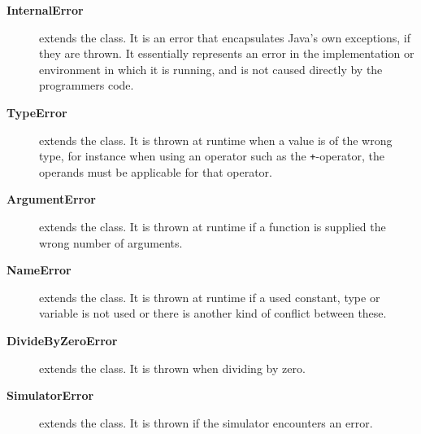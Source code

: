 \begin{description}
\item[\textbf{InternalError}] extends the  class. It is
  an error that encapsulates Java's own exceptions, if they are thrown. It
  essentially represents an error in the implementation or environment in which
  it is running, and is not caused directly by the programmers code.

\item[\textbf{TypeError}] extends the  class. It is
  thrown at runtime when a value is of the wrong type, for instance when using
  an operator such as the \texttt{+}-operator, the operands must be applicable
  for that operator.

\item[\textbf{ArgumentError}] extends the  class. It is
  thrown at runtime if a function is supplied the wrong number of arguments.

\item[\textbf{NameError}] extends the  class. It is
  thrown at runtime if a used constant, type or variable is not used or there is
  another kind of conflict between these.

\item[\textbf{DivideByZeroError}] extends the  class. It
  is thrown when dividing by zero.

\item[\textbf{SimulatorError}] extends the  class. It is thrown
  if the simulator encounters an error.
\end{description}

